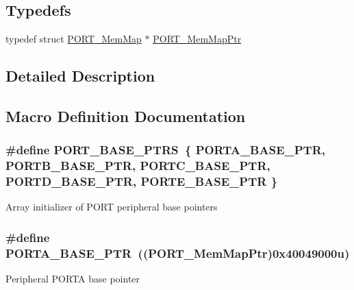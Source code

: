 \subsection*{Typedefs}
\begin{DoxyCompactItemize}
\item 
typedef struct \hyperlink{struct_p_o_r_t___mem_map}{P\+O\+R\+T\+\_\+\+Mem\+Map} $\ast$ \hyperlink{group___p_o_r_t___peripheral_ga0e26bafb7c17808f90278627bcbcaf8c}{P\+O\+R\+T\+\_\+\+Mem\+Map\+Ptr}
\end{DoxyCompactItemize}


\subsection{Detailed Description}


\subsection{Macro Definition Documentation}
\hypertarget{group___p_o_r_t___peripheral_ga54ff5179f8acaef2e1683cedfc0ef453}{}
\subsubsection[{P\+O\+R\+T\+\_\+\+B\+A\+S\+E\+\_\+\+P\+T\+R\+S}]{\setlength{\rightskip}{0pt plus 5cm}\#define P\+O\+R\+T\+\_\+\+B\+A\+S\+E\+\_\+\+P\+T\+R\+S~\{ {\bf P\+O\+R\+T\+A\+\_\+\+B\+A\+S\+E\+\_\+\+P\+T\+R}, {\bf P\+O\+R\+T\+B\+\_\+\+B\+A\+S\+E\+\_\+\+P\+T\+R}, {\bf P\+O\+R\+T\+C\+\_\+\+B\+A\+S\+E\+\_\+\+P\+T\+R}, {\bf P\+O\+R\+T\+D\+\_\+\+B\+A\+S\+E\+\_\+\+P\+T\+R}, {\bf P\+O\+R\+T\+E\+\_\+\+B\+A\+S\+E\+\_\+\+P\+T\+R} \}}\label{group___p_o_r_t___peripheral_ga54ff5179f8acaef2e1683cedfc0ef453}
Array initializer of P\+O\+R\+T peripheral base pointers \hypertarget{group___p_o_r_t___peripheral_gaa18ec7594fe603225220ec6eda4a19ce}{}
\subsubsection[{P\+O\+R\+T\+A\+\_\+\+B\+A\+S\+E\+\_\+\+P\+T\+R}]{\setlength{\rightskip}{0pt plus 5cm}\#define P\+O\+R\+T\+A\+\_\+\+B\+A\+S\+E\+\_\+\+P\+T\+R~(({\bf P\+O\+R\+T\+\_\+\+Mem\+Map\+Ptr})0x40049000u)}\label{group___p_o_r_t___peripheral_gaa18ec7594fe603225220ec6eda4a19ce}
Peripheral P\+O\+R\+T\+A base pointer \hypertarget{group___p_o_r_t___peripheral_ga585b4782d1ceb44492289af0019480f9}{}

